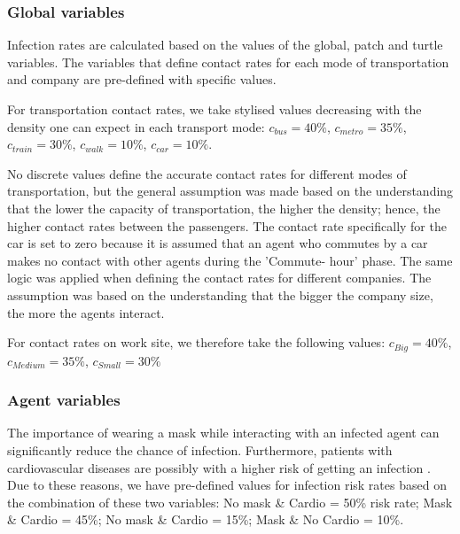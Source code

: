 \documentclass[smallextended]{svjour3}       %
\begin{document}
\subsubsection{Global variables}

Infection rates are calculated based on the values of the global, patch and turtle variables. The variables that define contact rates for each mode of transportation and company are pre-defined with specific values.

For transportation contact rates, we take stylised values decreasing with the density one can expect in each transport mode: $c_{bus} = 40\%$, $c_{metro} = 35\%$, $c_{train} = 30\%$, $c_{walk} = 10\%$, $c_{car} = 10\%$.

No discrete values define the accurate contact rates for different modes of transportation, but the general assumption was made based on the understanding that the lower the capacity of transportation, the higher the density; hence, the higher contact rates between the passengers. The contact rate specifically for the car is set to zero because it is assumed that an agent who commutes by a car makes no contact with other agents during the 'Commute- hour' phase. The same logic was applied when defining the contact rates for different companies. The assumption was based on the understanding that the bigger the company size, the more the agents interact.

For contact rates on work site, we therefore take the following values: $c_{Big} = 40\%$, $c_{Medium} = 35\%$, $c_{Small} = 30\%$


\subsubsection{Agent variables}


The importance of wearing a mask while interacting with an infected agent can significantly reduce the chance of infection. Furthermore, patients with cardiovascular diseases are possibly with a higher risk of getting an infection \cite{ielapi2020cardiovascular}. Due to these reasons, we have pre-defined values for infection risk rates based on the combination of these two variables: No mask \& Cardio = 50\% risk rate; Mask \& Cardio = 45\%; No mask \& Cardio = 15\%; Mask \& No Cardio = 10\%.


\end{document}
